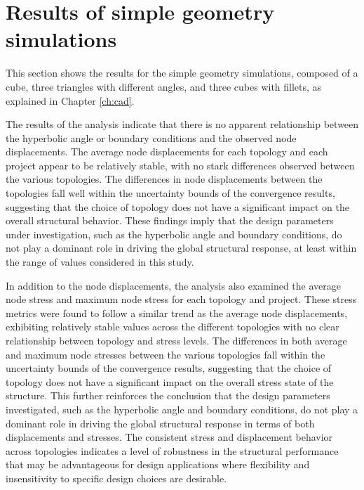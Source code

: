 \documentclass[../main.tex]{subfiles}
\begin{document}
\section{Results of simple geometry simulations}

This section shows the results for the simple geometry simulations, composed of a cube, three triangles with different angles, and three cubes with fillets, as explained in Chapter \ref{ch:cad}.


The results of the analysis indicate that there is no apparent relationship between the hyperbolic angle or boundary conditions and the observed node displacements. The average node displacements for each topology and each project appear to be relatively stable, with no stark differences observed between the various topologies. The differences in node displacements between the topologies fall well within the uncertainty bounds of the convergence results, suggesting that the choice of topology does not have a significant impact on the overall structural behavior. These findings imply that the design parameters under investigation, such as the hyperbolic angle and boundary conditions, do not play a dominant role in driving the global structural response, at least within the range of values considered in this study. 

In addition to the node displacements, the analysis also examined the average node stress and maximum node stress for each topology and project. These stress metrics were found to follow a similar trend as the average node displacements, exhibiting relatively stable values across the different topologies with no clear relationship between topology and stress levels. The differences in both average and maximum node stresses between the various topologies fall within the uncertainty bounds of the convergence results, suggesting that the choice of topology does not have a significant impact on the overall stress state of the structure. This further reinforces the conclusion that the design parameters investigated, such as the hyperbolic angle and boundary conditions, do not play a dominant role in driving the global structural response in terms of both displacements and stresses. The consistent stress and displacement behavior across topologies indicates a level of robustness in the structural performance that may be advantageous for design applications where flexibility and insensitivity to specific design choices are desirable.
\end{document}
